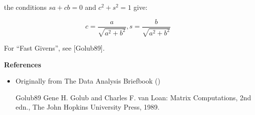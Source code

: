 \documentclass{article}
\begin{document}
the conditions $sa + cb = 0$ and $c^2 + s^2 = 1$ give:

$$ c = \frac{a}{\sqrt{a^2+b^2}} , s = \frac{b}{\sqrt{a^2+b^2}} $$

For ``Fast Givens'', see [Golub89].

{\bf References}

\begin{itemize}
\item Originally from The Data Analysis Briefbook
()
\end{itemize} 

\begin{itemize}
\item[Golub89] Gene H. Golub and Charles F. van Loan: Matrix Computations, 2nd edn., The John Hopkins University Press, 1989.
\end{itemize}
\end{document}
